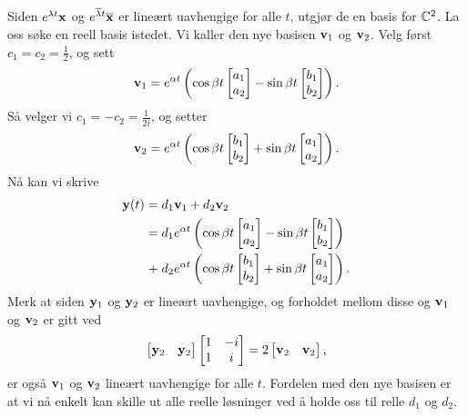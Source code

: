 Siden  $e^{\lambda t}\mathbf{x}$ og $e^{\overline \lambda t}\overline{\mathbf{x}}$ er lineært uavhengige for alle $t$, utgjør de en basis for $\mathbb{C}^2$. La oss søke en reell basis istedet.
Vi kaller den nye basisen $\mathbf{v}_1$ og $\mathbf{v}_2$. Velg først $c_1=c_2=\frac{1}{2}$, og sett
\[
\mathbf{v}_1=e^{\alpha t} \left(\cos \beta t\begin{bmatrix}  a_{1} \\ a_{2}\end{bmatrix}-\sin \beta t\begin{bmatrix}  b_{1} \\ b_{2}\end{bmatrix}\right).
\]
Så velger vi $c_1=-c_2=\frac{1}{2i}$, og setter
\[
\mathbf{v}_2=e^{\alpha t} \left(\cos \beta t\begin{bmatrix}  b_{1} \\ b_{2}\end{bmatrix}+\sin \beta t\begin{bmatrix}  a_{1} \\ a_{2}\end{bmatrix}\right).
\]
Nå kan vi skrive 
\begin{align*}
\mathbf{y}(t)=\;&d_1\mathbf{v}_1 +d_2\mathbf{v}_2\\ =\;&d_1 e^{\alpha t} \left(\cos \beta t\begin{bmatrix}  a_{1} \\ a_{2}\end{bmatrix}-\sin \beta t\begin{bmatrix}  b_{1} \\ b_{2}\end{bmatrix}\right) 
\\+\;&d_2e^{\alpha t} \left(\cos \beta t\begin{bmatrix}  b_{1} \\ b_{2}\end{bmatrix}+\sin \beta t\begin{bmatrix}  a_{1} \\ a_{2}\end{bmatrix}\right). 
\end{align*}
Merk at siden $\mathbf{y}_1$ og $\mathbf{y}_2$ er lineært uavhengige, og forholdet mellom disse og $\mathbf{v}_1$ og $\mathbf{v}_2$ er gitt ved
\[
\begin{bmatrix} \mathbf{y}_2  & \mathbf{y}_2 \end{bmatrix}\begin{bmatrix} 1 & -i \\ 1 &i \end{bmatrix}=2\begin{bmatrix} \mathbf{v}_2  & \mathbf{v}_2 \end{bmatrix},
\]
er også $\mathbf{v}_1$ og $\mathbf{v}_2$ lineært uavhengige for alle $t$. Fordelen med den nye basisen er at vi nå enkelt kan skille ut alle reelle løsninger ved å holde oss til relle $d_1$ og $d_2$.


